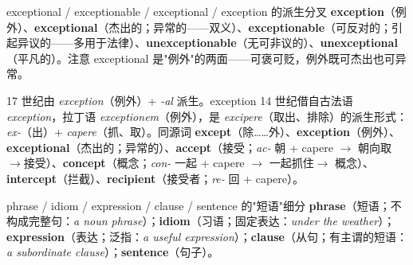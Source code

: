 \documentclass[../main.tex]{subfiles}
\begin{document}


\begin{gram}{exceptional / exceptionable / exceptional / exception 的派生分叉}
\textbf{exception}（例外）、\textbf{exceptional}（杰出的；异常的——双义）、\textbf{exceptionable}（可反对的；引起异议的——多用于法律）、\textbf{unexceptionable}（无可非议的）、\textbf{unexceptional}（平凡的）。注意 exceptional 是"例外"的两面——可褒可贬，例外既可杰出也可异常。
\end{gram}

\begin{origin}
17 世纪由 \textit{exception}（例外）+ \textit{-al} 派生。exception 14 世纪借自古法语 \textit{exception}，拉丁语 \textit{exceptionem}（例外），是 \textit{excipere}（取出、排除）的派生形式：\textit{ex-}（出）+ \textit{capere}（抓、取）。同源词 \textbf{except}（除……外）、\textbf{exception}（例外）、\textbf{exceptional}（杰出的；异常的）、\textbf{accept}（接受；\textit{ac-} 朝 + capere $\to$ 朝向取$\to$接受）、\textbf{concept}（概念；\textit{con-} 一起 + capere $\to$ 一起抓住$\to$ 概念）、\textbf{intercept}（拦截）、\textbf{recipient}（接受者；\textit{re-} 回 + capere）。
\end{origin}




\begin{lex}{phrase / idiom / expression / clause / sentence 的"短语"细分}
\textbf{phrase}（短语；不构成完整句：\textit{a noun phrase}）；\textbf{idiom}（习语；固定表达：\textit{under the weather}）；\textbf{expression}（表达；泛指：\textit{a useful expression}）；\textbf{clause}（从句；有主谓的短语：\textit{a subordinate clause}）；\textbf{sentence}（句子）。
\end{lex}
\end{document}
